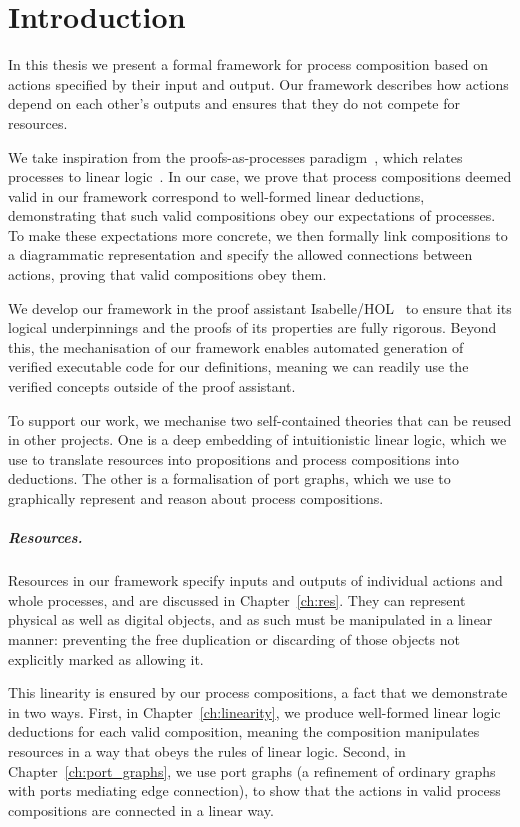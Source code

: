 \documentclass[class=smolathesis,crop=false]{standalone}
\begin{document}
\chapter{Introduction}
\label{ch:intro}

In this thesis we present a formal framework for process composition based on actions specified by their input and output.
Our framework describes how actions depend on each other's outputs and ensures that they do not compete for resources.

We take inspiration from the proofs-as-processes paradigm~\cite{abramsky-1994}, which relates processes to linear logic~\cite{girard-1987}.
In our case, we prove that process compositions deemed valid in our framework correspond to well-formed linear deductions, demonstrating that such valid compositions obey our expectations of processes.
To make these expectations more concrete, we then formally link compositions to a diagrammatic representation and specify the allowed connections between actions, proving that valid compositions obey them.

We develop our framework in the proof assistant Isabelle/HOL~\cite{nipkow_wenzel_paulson-2002} to ensure that its logical underpinnings and the proofs of its properties are fully rigorous.
Beyond this, the mechanisation of our framework enables automated generation of verified executable code for our definitions, meaning we can readily use the verified concepts outside of the proof assistant.

To support our work, we mechanise two self-contained theories that can be reused in other projects.
One is a deep embedding of intuitionistic linear logic, which we use to translate resources into propositions and process compositions into deductions.
The other is a formalisation of port graphs, which we use to graphically represent and reason about process compositions.

\paragraph*{Resources.}
Resources in our framework specify inputs and outputs of individual actions and whole processes, and are discussed in Chapter~\ref{ch:res}.
They can represent physical as well as digital objects, and as such must be manipulated in a linear manner: preventing the free duplication or discarding of those objects not explicitly marked as allowing it.

This linearity is ensured by our process compositions, a fact that we demonstrate in two ways.
First, in Chapter~\ref{ch:linearity}, we produce well-formed linear logic deductions for each valid composition, meaning the composition manipulates resources in a way that obeys the rules of linear logic.
Second, in Chapter~\ref{ch:port_graphs}, we use port graphs (a refinement of ordinary graphs with ports mediating edge connection), to show that the actions in valid process compositions are connected in a linear way.
\end{document}
